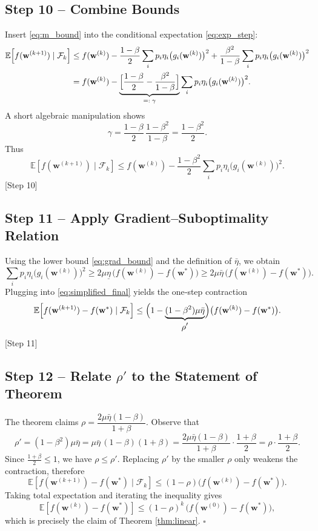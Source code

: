 \documentclass{article}
\newcommand{\E}{\mathbb{E}}
\begin{document}
\subsection*{Step 10 – Combine Bounds}
Insert \eqref{eq:m_bound} into the conditional expectation \eqref{eq:exp_step}:
\begin{align}
\E\!\left[f(\mathbf w^{(k+1)})\mid\mathcal F_k\right]
&\le f(\mathbf w^{(k)})
   -\frac{1-\beta}{2}\sum_{i}p_i\eta_i\bigl(g_i(\mathbf w^{(k)})\bigr)^{2}
   +\frac{\beta^{2}}{1-\beta}
      \sum_{i}p_i\eta_i\bigl(g_i(\mathbf w^{(k)})\bigr)^{2} \nonumber\\
&= f(\mathbf w^{(k)})-
   \underbrace{\Bigl[\frac{1-\beta}{2}-\frac{\beta^{2}}{1-\beta}\Bigr]}
            _{=: \;\gamma}
   \sum_{i}p_i\eta_i\bigl(g_i(\mathbf w^{(k)})\bigr)^{2}. \label{eq:combined}
\end{align}
A short algebraic manipulation shows
\[
\gamma=\frac{1-\beta}{2}\,\frac{1-\beta^{2}}{1-\beta}
      =\frac{1-\beta^{2}}{2}.
\]
Thus
\[
\E\!\left[f(\mathbf w^{(k+1)})\mid\mathcal F_k\right]
\le f(\mathbf w^{(k)})-
   \frac{1-\beta^{2}}{2}
   \sum_{i}p_i\eta_i\bigl(g_i(\mathbf w^{(k)})\bigr)^{2}. \label{eq:simplified_final}
\]
[Step 10]

\subsection*{Step 11 – Apply Gradient–Suboptimality Relation}
Using the lower bound \eqref{eq:grad_bound} and the definition of
$\bar\eta$, we obtain
\[
\sum_{i}p_i\eta_i\bigl(g_i(\mathbf w^{(k)})\bigr)^{2}
\ge 2\mu\underline\eta\,
      \bigl(f(\mathbf w^{(k)})-f(\mathbf w^{*})\bigr)
\ge 2\mu\bar\eta\,
      \bigl(f(\mathbf w^{(k)})-f(\mathbf w^{*})\bigr).
\]
Plugging into \eqref{eq:simplified_final} yields the one‑step contraction
\[
\E\!\left[f(\mathbf w^{(k+1)})-f(\mathbf w^{*})\mid\mathcal F_k\right]
\le\Bigl(1-\underbrace{(1-\beta^{2})\mu\bar\eta}_{\displaystyle\rho'}\Bigr)
    \bigl(f(\mathbf w^{(k)})-f(\mathbf w^{*})\bigr). \label{eq:one_step}
\]
[Step 11]

\subsection*{Step 12 – Relate $\rho'$ to the Statement of Theorem}
The theorem claims $\rho=\dfrac{2\mu\bar\eta(1-\beta)}{1+\beta}$. Observe that
\[
\rho'=(1-\beta^{2})\mu\bar\eta
      =\mu\bar\eta\,(1-\beta)(1+\beta)
      =\frac{2\mu\bar\eta(1-\beta)}{1+\beta}\cdot\frac{1+\beta}{2}
      =\rho\cdot\frac{1+\beta}{2}.
\]
Since $\frac{1+\beta}{2}\le1$, we have $\rho\le\rho'$. Replacing $\rho'$ by the
smaller $\rho$ only weakens the contraction, therefore
\[
\E\!\left[f(\mathbf w^{(k+1)})-f(\mathbf w^{*})\mid\mathcal F_k\right]
\le (1-\rho)\bigl(f(\mathbf w^{(k)})-f(\mathbf w^{*})\bigr).
\]
Taking total expectation and iterating the inequality gives
\[
\E\!\left[f(\mathbf w^{(k)})-f(\mathbf w^{*})\right]
\le (1-\rho)^{k}\,
    \bigl(f(\mathbf w^{(0)})-f(\mathbf w^{*})\bigr),
\]
which is precisely the claim of Theorem \ref{thm:linear}. \hfill $\square$
\end{document}
